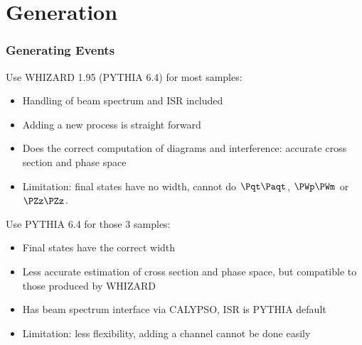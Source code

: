 \documentclass{beamer}
\begin{document}
\section{Generation}
{
\begin{frame}
\frametitle{Generating Events}
Use WHIZARD 1.95 (PYTHIA 6.4) for most samples:
\begin{itemize}
\item Handling of \alert{beam spectrum and ISR included}
\item Adding a \alert{new process} is straight forward
\item Does the correct computation of diagrams and interference: \alert{accurate cross section and phase space}
\item Limitation: \alert{final states have no width}, cannot do $\Pqt\Paqt$, $\PWp\PWm$ or $\PZz\PZz$.
\end{itemize} 
Use PYTHIA 6.4 for those 3 samples:
\begin{itemize}
\item Final states have the correct width
\item Less accurate estimation of cross section and phase space, but compatible to those produced by WHIZARD
\item Has \alert{beam spectrum interface via CALYPSO}, ISR is PYTHIA default
\item Limitation: \alert{less flexibility}, adding a channel cannot be done easily
\end{itemize}
\end{frame}
}
\end{document}
